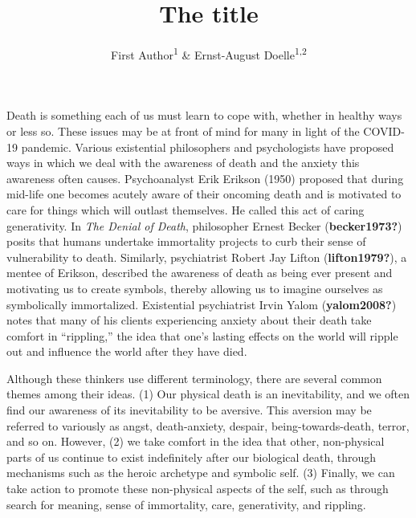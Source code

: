 \documentclass[
  man]{apa6}
\title{The title}
\author{First Author\textsuperscript{1} \& Ernst-August Doelle\textsuperscript{1,2}}
\date{}
\affiliation{\vspace{0.5cm}\textsuperscript{1} Wilhelm-Wundt-University\\\textsuperscript{2} Konstanz Business School}
\begin{document}
\maketitle

Death is something each of us must learn to cope with, whether in
healthy ways or less so. These issues may be at front of mind for many
in light of the COVID-19 pandemic. Various existential philosophers and
psychologists have proposed ways in which we deal with the awareness of
death and the anxiety this awareness often causes. Psychoanalyst Erik
Erikson (1950) proposed that during mid-life one becomes
acutely aware of their oncoming death and is motivated to care for
things which will outlast themselves. He called this act of caring
generativity. In \emph{The Denial of Death}, philosopher Ernest Becker
(\textbf{becker1973?}) posits that humans undertake immortality projects to curb
their sense of vulnerability to death. Similarly, psychiatrist Robert
Jay Lifton (\textbf{lifton1979?}), a mentee of Erikson, described the awareness
of death as being ever present and motivating us to create symbols,
thereby allowing us to imagine ourselves as symbolically immortalized.
Existential psychiatrist Irvin Yalom (\textbf{yalom2008?}) notes that many of
his clients experiencing anxiety about their death take comfort in
``rippling,'' the idea that one's lasting effects on the world will ripple
out and influence the world after they have died.

Although these thinkers use different terminology, there are several
common themes among their ideas. (1) Our physical death is an
inevitability, and we often find our awareness of its inevitability to
be aversive. This aversion may be referred to variously as angst,
death-anxiety, despair, being-towards-death, terror, and so on. However,
(2) we take comfort in the idea that other, non-physical parts of us
continue to exist indefinitely after our biological death, through
mechanisms such as the heroic archetype and symbolic self. (3) Finally,
we can take action to promote these non-physical aspects of the self,
such as through search for meaning, sense of immortality, care,
generativity, and rippling.
\end{document}
